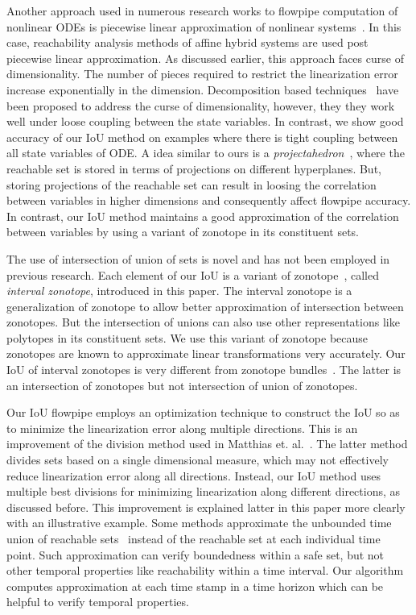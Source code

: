 Another approach used in numerous research works to flowpipe
computation of nonlinear ODEs is piecewise linear approximation of
nonlinear
systems~\cite{althoff2008reachability,li2020reachability,dang2010accurate,ramdani2009hybrid,han2006reachability}.
In this case, reachability analysis methods of affine hybrid systems
are used post piecewise linear approximation.  As discussed earlier,
this approach faces curse of dimensionality.  The number of pieces
required to restrict the linearization error increase exponentially in
the dimension.  Decomposition based
techniques~\cite{chen2018decomposition,chen2016decomposed} have been
proposed to address the curse of dimensionality, however, they they
work well under loose coupling between the state variables.  In
contrast, we show good accuracy of our IoU method on examples where
there is tight coupling between all state variables of ODE.
%
A idea similar to ours is a
\emph{projectahedron}~\cite{greenstreet1999reachability}, where the reachable
set is stored in terms of projections on different hyperplanes.  But,
storing projections of the reachable set can result in loosing the
correlation between variables in higher dimensions and consequently
affect flowpipe accuracy.  In contrast, our IoU method maintains a
good approximation of the correlation between variables by using a
variant of zonotope in its constituent sets.

The use of intersection of union of sets is novel and has not been
employed in previous research.  Each element of our IoU is a variant of
zonotope~\cite{girard2005reachability}, called \emph{interval
  zonotope}, introduced in this paper.  The interval zonotope is a
generalization of zonotope to allow better approximation of
intersection between zonotopes.  But the intersection of unions can
also use other representations like polytopes in its constituent sets.
We use this variant of zonotope because zonotopes are known to
approximate linear transformations very accurately.  Our IoU of
interval zonotopes is very different from zonotope
bundles~\cite{althoff2011zonotope}.  The latter is an intersection of
zonotopes but not intersection of union of zonotopes.

Our IoU flowpipe employs an optimization technique to construct the
IoU so as to minimize the linearization error along multiple
directions.  This is an improvement of the division method used in
Matthias et. al.~\cite{althoff2008reachability}.  The latter method
divides sets based on a single dimensional measure, which may not
effectively reduce linearization error along all directions.  Instead,
our IoU method uses multiple best divisions for minimizing
linearization along different directions, as discussed before.  This
improvement is explained latter in this paper more clearly with an
illustrative example.  Some methods approximate the unbounded time
union of reachable
sets~\cite{tiwari2008generating,prajna2006barrier,rodriguez2005generating}
instead of the reachable set at each individual time point. Such
approximation can verify boundedness within a safe set, but not other
temporal properties like reachability within a time interval.  Our
algorithm computes approximation at each time stamp in a time horizon
which can be helpful to verify temporal
properties.
